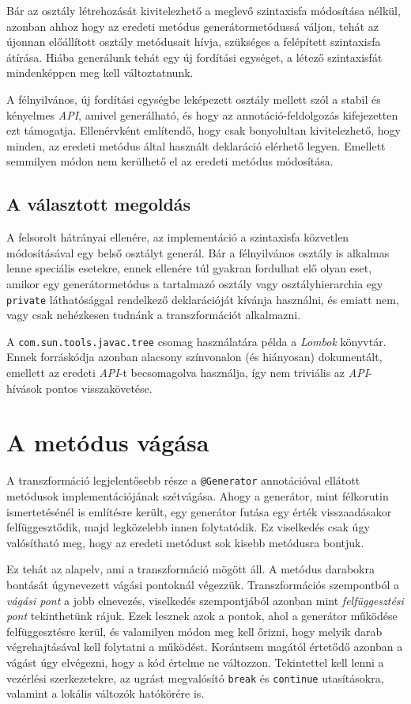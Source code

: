 Bár az osztály létrehozását kivitelezhető a meglevő szintaxisfa módosítása nélkül, azonban ahhoz hogy az eredeti metódus generátormetódussá váljon, tehát az újonnan előállított osztály metódusait hívja, szükséges a felépített szintaxisfa átírása. Hiába generálunk tehát egy új fordítási egységet, a létező szintaxisfát mindenképpen meg kell változtatnunk.

A félnyilvános, új fordítási egységbe leképezett osztály mellett szól a stabil és kényelmes \textit{API}, amivel generálható, és hogy az annotáció-feldolgozás kifejezetten ezt támogatja. Ellenérvként említendő, hogy csak bonyolultan kivitelezhető, hogy minden, az eredeti metódus által használt deklaráció elérhető legyen. Emellett semmilyen módon nem kerülhető el az eredeti metódus módosítása.

\subsection{A választott megoldás}

A felsorolt hátrányai ellenére, az implementáció a szintaxisfa közvetlen módosításával egy belső osztályt generál. Bár a félnyilvános osztály is alkalmas lenne speciális esetekre, ennek ellenére túl gyakran fordulhat elő olyan eset, amikor egy generátormetódus a tartalmazó osztály vagy osztályhierarchia egy \texttt{private} láthatósággal rendelkező deklarációját kívánja használni, és emiatt nem, vagy csak nehézkesen tudnánk a transzformációt alkalmazni.

A \texttt{com.sun.tools.javac.tree} csomag használatára példa a \textit{Lombok} könyvtár. Ennek forráskódja azonban alacsony színvonalon (és hiányosan) dokumentált, emellett az eredeti \textit{API}-t becsomagolva használja, így nem triviális az \textit{API}-hívások pontos visszakövetése.

\section{A metódus vágása}

A transzformáció legjelentősebb része a \texttt{@Generator} annotációval ellátott metódusok implementációjának szétvágása. Ahogy a generátor, mint félkorutin ismertetésénél is említésre került, egy generátor futása egy érték visszaadásakor felfüggesztődik, majd legközelebb innen folytatódik. Ez viselkedés csak úgy valósítható meg, hogy az eredeti metódust sok kisebb metódusra bontjuk.

Ez tehát az alapelv, ami a transzformáció mögött áll. A metódus darabokra bontását úgynevezett vágási pontoknál végezzük. Transzformációs szempontból a \textit{vágási pont} a jobb elnevezés, viselkedés szempontjából azonban mint \textit{felfüggesztési pont} tekinthetünk rájuk. Ezek lesznek azok a pontok, ahol a generátor működése felfüggesztésre kerül, és valamilyen módon meg kell őrizni, hogy melyik darab végrehajtásával kell folytatni a működést. Korántsem magától értetődő azonban a vágást úgy elvégezni, hogy a kód értelme ne változzon. Tekintettel kell lenni a vezérlési szerkezetekre, az ugrást megvalósító \texttt{break} és \texttt{continue} utasításokra, valamint a lokális változók hatókörére is.

